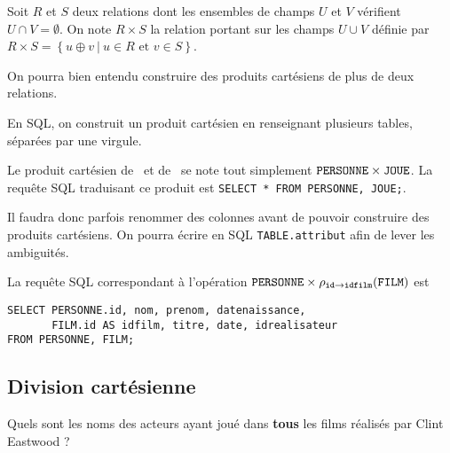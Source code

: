 \begin{defi}
  Soit $R$ et $S$ deux relations dont les ensembles de champs $U$ et $V$ vérifient
  $U\cap V =\emptyset$. On note $R\times S$ la relation portant sur les champs $U\cup
  V$ définie par
$
    R\times S  = \left\{u\oplus v ~|~ u\in R \text{ et } v\in S\right\} $.
    
  On pourra bien entendu construire des produits cartésiens de plus de deux relations. 
\end{defi}

En SQL, on construit un produit cartésien en renseignant plusieurs tables, séparées par une virgule. 
\begin{exemple}
  Le produit cartésien de \PERSONNE\ et de \JOUE\ se note tout simplement $\mathtt{PERSONNE} \times \mathtt{JOUE}$. 
  La requête SQL traduisant ce produit est \verb+SELECT * FROM PERSONNE, JOUE;+.

\end{exemple}


\begin{rem}
  Il faudra donc parfois renommer des colonnes avant de pouvoir construire des produits cartésiens. 
  On pourra écrire en SQL \texttt{TABLE.attribut} afin de lever les ambiguités. 
\end{rem}

\begin{exemple}
  La requête SQL correspondant à l'opération $\mathtt{PERSONNE} \times \rho_{\mathtt{id} \rightarrow \mathtt{idfilm}}(\mathtt{FILM})$ est
\begin{verbatim}
SELECT PERSONNE.id, nom, prenom, datenaissance, 
       FILM.id AS idfilm, titre, date, idrealisateur
FROM PERSONNE, FILM;
\end{verbatim}

\end{exemple}


\subsection{Division cartésienne}

Quels sont les noms des acteurs ayant joué dans \textbf{tous} les films réalisés par Clint Eastwood ? 

